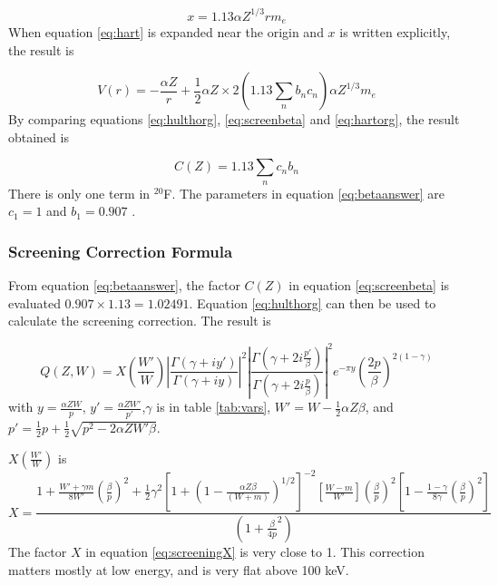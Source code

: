 \documentclass[../MaxHughesThesis.tex]{subfiles}
\begin{document}
\begin{equation}
	x = 1.13 \alpha Z^{1/3} r m_{e}
	\label{eq:screeningx}
\end{equation}
When equation \ref{eq:hart} is expanded near the origin and $x$ is written explicitly, the result is %

\begin{equation}
	V(r) = - \frac{\alpha Z}{r} + \frac{1}{2} \alpha Z \times 2 (1.13 \sum_{n} b_{n} c_{n}) \alpha Z^{1/3} m_{e} 
	\label{eq:hartorg}
\end{equation}
By comparing equations \ref{eq:hulthorg}, \ref{eq:screenbeta} and \ref{eq:hartorg}, the result obtained is %

\begin{equation}
	C(Z) = 1.13 \sum_{n} c_{n} b_{n}
	\label{eq:betaanswer}
\end{equation} 
There is only one term in $^{20}$F. 
The parameters in equation \ref{eq:betaanswer} are $c_{1} = 1$ and $b_{1} = 0.907$ \cite{Bya56}.

\subsubsection{Screening Correction Formula}
From equation \ref{eq:betaanswer}, the factor $C(Z)$ in equation \ref{eq:screenbeta} is evaluated $0.907 \times 1.13 = 1.02491$.
Equation \ref{eq:hulthorg} can then be used to calculate the screening correction.
The result is \cite{Buh84} %

\begin{equation}
	Q(Z,W) = X(\frac{W'}{W})|\frac{\Gamma(\gamma + i y')}{\Gamma(\gamma+ i y)}|^{2}|\frac{\Gamma(\gamma + 2 i \frac{p'}{\beta})}{\Gamma(\gamma + 2 i \frac{p}{\beta})}|^{2}e^{-\pi y}(\frac{2p}{\beta})^{2(1 - \gamma)}
	\label{eq:screeningQ}
\end{equation}
with $y = \frac{\alpha Z W}{p}$, $y' = \frac{\alpha Z W'}{p'}$,$ \gamma$ is in table \ref{tab:vars}, $W' = W - \frac{1}{2}\alpha Z \beta$, and $p' = \frac{1}{2}p + \frac{1}{2}\sqrt{p^{2} - 2 \alpha Z W' \beta}$.

$X(\frac{W'}{W})$ is %
\begin{equation}
	X = \frac{1 + \frac{W' + \gamma m}{8 W'} (\frac{\beta}{p})^{2} + \frac{1}{2}\gamma^{2}[1 + (1 - \frac{\alpha Z \beta}{(W + m)})^{1/2}]^{-2} [\frac{W - m}{W'}] (\frac{\beta}{p})^{2}[1 - \frac{1 - \gamma}{8\gamma}(\frac{\beta}{p})^{2}]}{(1 + \frac{\beta}{4p}^{2})}
	\label{eq:screeningX}
\end{equation}
The factor $X$ in equation \ref{eq:screeningX} is very close to 1.
This correction matters mostly at low energy, and is very flat above 100 keV.
\end{document}
